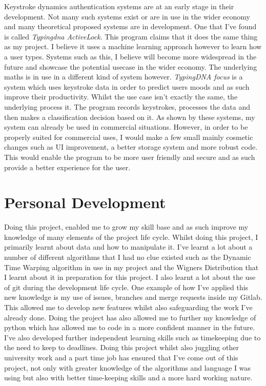 \documentclass[10pt,a4paper]{report}
\begin{document}
Keystroke dynamics authentication systems are at an early stage in their development. Not many such systems exist or are in use in the wider economy and many theoretical proposed systems are in development. One that I've found is called \emph{Typingdna ActiveLock}\cite{typingdna_2022}. This program claims that it does the same thing as my project. I believe it uses a machine learning approach however to learn how a user types. Systems such as this, I believe will become more widespread in the future and showcase the potential usecase in the wider economy.  The underlying maths is in use in a different kind of system however. \emph{TypingDNA focus}\cite{typingdna_2021} is a system which uses keystroke data in order to predict users moods and as such improve their productivity. Whilst the use case isn't exactly the same, the underlying process it. The program records keystrokes, processes the data and then makes a classification decision based on it. As shown by these systems, my system can already be used in commercial situations. However, in order to be properly suited for commercial uses, I would make a few small mainly cosmetic changes such as UI improvement, a better storage system and more robust code. This would enable the program to be more user friendly and secure and as such provide a better experience for the user.


\section{Personal Development}

Doing this project, enabled me to grow my skill base and as such improve my knowledge of many elements of the project life cycle. Whilst doing this project, I primarily learnt about data and how to manipulate it. I've learnt a lot about a number of different algorithms that I had no clue existed such as the Dynamic Time Warping algorithm in use in my project and the Wigners Distribution that I learnt about it in preparation for this project. I also learnt a lot about the use of git during the development life cycle. One example of how I've applied this new knowledge is my use of issues, branches and merge requests inside my Gitlab. This allowed me to develop new features whilst also safeguarding the work I've already done. Doing the project has also allowed me to further my knowledge of python which has allowed me to code in a more confident manner in the future. I've also developed further independent learning skills such as timekeeping due to the need to keep to deadlines. Doing this project whilst also juggling other university work and a part time job has ensured that I've come out of this project, not only with greater knowledge of   the algorithms and language I was using but also with better time-keeping skills and a more hard working nature.
\end{document}
